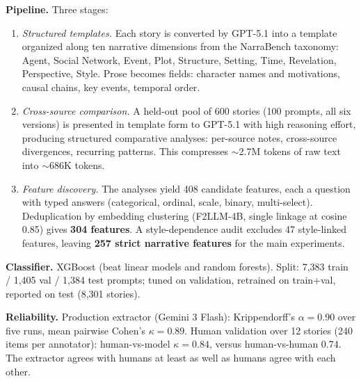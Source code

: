 \documentclass[11pt]{article}
\begin{document}
\textbf{Pipeline.} Three stages:
\begin{enumerate}
\item \emph{Structured templates.} Each story is converted by GPT-5.1 into a template organized along ten narrative dimensions from the NarraBench taxonomy: Agent, Social Network, Event, Plot, Structure, Setting, Time, Revelation, Perspective, Style. Prose becomes fields: character names and motivations, causal chains, key events, temporal order.
\item \emph{Cross-source comparison.} A held-out pool of 600 stories (100 prompts, all six versions) is presented in template form to GPT-5.1 with high reasoning effort, producing structured comparative analyses: per-source notes, cross-source divergences, recurring patterns. This compresses $\sim$2.7M tokens of raw text into $\sim$686K tokens.
\item \emph{Feature discovery.} The analyses yield 408 candidate features, each a question with typed answers (categorical, ordinal, scale, binary, multi-select). Deduplication by embedding clustering (F2LLM-4B, single linkage at cosine 0.85) gives \textbf{304 features}. A style-dependence audit excludes 47 style-linked features, leaving \textbf{257 strict narrative features} for the main experiments.
\end{enumerate}

\textbf{Classifier.} XGBoost (beat linear models and random forests). Split: 7,383 train / 1,405 val / 1,384 test prompts; tuned on validation, retrained on train+val, reported on test (8,301 stories).

\textbf{Reliability.} Production extractor (Gemini 3 Flash): Krippendorff's $\alpha=0.90$ over five runs, mean pairwise Cohen's $\kappa=0.89$. Human validation over 12 stories (240 items per annotator): human-vs-model $\kappa=0.84$, versus human-vs-human 0.74. The extractor agrees with humans at least as well as humans agree with each other.
\end{document}
